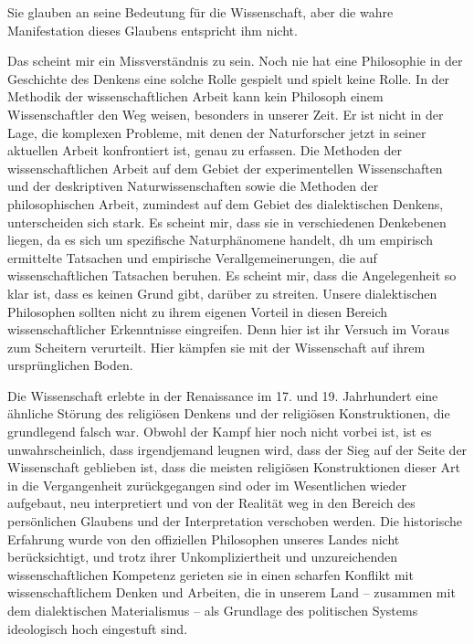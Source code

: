 \documentclass[11pt,a4paper]{book}
\begin{document}
Sie glauben an seine Bedeutung für die Wissenschaft, aber die wahre Manifestation dieses Glaubens entspricht ihm nicht.



Das scheint mir ein Missverständnis zu sein. Noch nie hat eine Philosophie in der Geschichte des Denkens eine solche Rolle gespielt und spielt keine Rolle. In der Methodik der wissenschaftlichen Arbeit kann kein Philosoph einem Wissenschaftler den Weg weisen, besonders in unserer Zeit. Er ist nicht in der Lage, die komplexen Probleme, mit denen der Naturforscher jetzt in seiner aktuellen Arbeit konfrontiert ist, genau zu erfassen. Die Methoden der wissenschaftlichen Arbeit auf dem Gebiet der experimentellen Wissenschaften und der deskriptiven Naturwissenschaften sowie die Methoden der philosophischen Arbeit, zumindest auf dem Gebiet des dialektischen Denkens, unterscheiden sich stark. Es scheint mir, dass sie in verschiedenen Denkebenen liegen, da es sich um spezifische Naturphänomene handelt, dh um empirisch ermittelte Tatsachen und empirische Verallgemeinerungen, die auf wissenschaftlichen Tatsachen beruhen. Es scheint mir, dass die Angelegenheit so klar ist, dass es keinen Grund gibt, darüber zu streiten. Unsere dialektischen Philosophen sollten nicht zu ihrem eigenen Vorteil in diesen Bereich wissenschaftlicher Erkenntnisse eingreifen. Denn hier ist ihr Versuch im Voraus zum Scheitern verurteilt. Hier kämpfen sie mit der Wissenschaft auf ihrem ursprünglichen Boden.



Die Wissenschaft erlebte in der Renaissance im 17. und 19. Jahrhundert eine ähnliche Störung des religiösen Denkens und der religiösen Konstruktionen, die grundlegend falsch war. Obwohl der Kampf hier noch nicht vorbei ist, ist es unwahrscheinlich, dass irgendjemand leugnen wird, dass der Sieg auf der Seite der Wissenschaft geblieben ist, dass die meisten religiösen Konstruktionen dieser Art in die Vergangenheit zurückgegangen sind oder im Wesentlichen wieder aufgebaut, neu interpretiert und von der Realität weg in den Bereich des persönlichen Glaubens und der Interpretation verschoben werden. Die historische Erfahrung wurde von den offiziellen Philosophen unseres Landes nicht berücksichtigt, und trotz ihrer Unkompliziertheit und unzureichenden wissenschaftlichen Kompetenz gerieten sie in einen scharfen Konflikt mit wissenschaftlichem Denken und Arbeiten, die in unserem Land -- zusammen mit dem dialektischen Materialismus -- als Grundlage des politischen Systems ideologisch hoch eingestuft sind.
\end{document}
